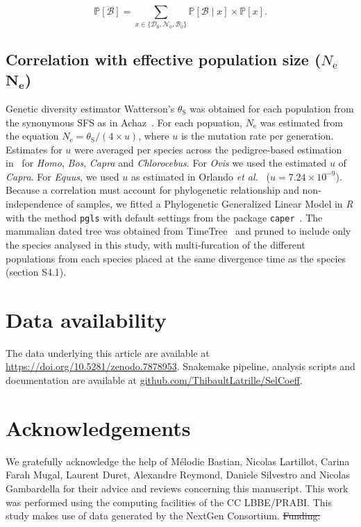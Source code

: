 \documentclass[10pt,letterpaper]{article}
\newcommand{\Ne}{N_{\text{e}}}
\newcommand{\proba}{\mathbb{P}}
\newcommand{\SphyDel}{\mathcal{D}_0}
\newcommand{\SphyNeu}{\mathcal{N}_0}
\newcommand{\SphyBen}{\mathcal{B}_0}
\newcommand{\Sphyclass}{x}
\newcommand{\given}{\mid}
\newcommand{\SpopBen}{\mathcal{B}}
\newcommand{\thetaSyn}{\theta_{\text{S}}}
\providecommand{\DIFdeltex}[1]{{\protect\color{red}\sout{#1}}}                      %
\providecommand{\DIFaddbegin}{} %
\providecommand{\DIFaddend}{} %
\providecommand{\DIFdelbegin}{} %
\providecommand{\DIFdelend}{} %
\providecommand{\DIFdel}[1]{\texorpdfstring{\DIFdeltex{#1}}{}} %
\newcommand{\DIFscaledelfig}{0.5}
\newlength{\DIFdelgraphicswidth} %
\newlength{\DIFdelgraphicsheight} %
\newcommand{\DIFaddincludegraphics}[2][]{{\color{blue}\fbox{\DIFOincludegraphics[#1]{#2}}}} %
\newcommand{\DIFdelincludegraphics}[2][]{%
\sbox{\DIFdelgraphicsbox}{\DIFOincludegraphics[#1]{#2}}%
\settoboxwidth{\DIFdelgraphicswidth}{\DIFdelgraphicsbox} %
\settoboxtotalheight{\DIFdelgraphicsheight}{\DIFdelgraphicsbox} %
\scalebox{\DIFscaledelfig}{%
\parbox[b]{\DIFdelgraphicswidth}{\usebox{\DIFdelgraphicsbox}\\[-\baselineskip] \rule{\DIFdelgraphicswidth}{0em}}\llap{\resizebox{\DIFdelgraphicswidth}{\DIFdelgraphicsheight}{%
\setlength{\unitlength}{\DIFdelgraphicswidth}%
\begin{picture}(1,1)%
\thicklines\linethickness{2pt} %
{\color[rgb]{1,0,0}\put(0,0){\framebox(1,1){}}}%
{\color[rgb]{1,0,0}\put(0,0){\line( 1,1){1}}}%
{\color[rgb]{1,0,0}\put(0,1){\line(1,-1){1}}}%
\end{picture}%
}\hspace*{3pt}}} %
} %
\DeclareRobustCommand{\DIFaddbegin}{\DIFOaddbegin \let\includegraphics\DIFaddincludegraphics} %
\DeclareRobustCommand{\DIFaddend}{\DIFOaddend \let\includegraphics\DIFOincludegraphics} %
\DeclareRobustCommand{\DIFdelbegin}{\DIFOdelbegin \let\includegraphics\DIFdelincludegraphics} %
\DeclareRobustCommand{\DIFdelend}{\DIFOaddend \let\includegraphics\DIFOincludegraphics} %
\begin{document}
\begin{equation}
\proba [ \SpopBen ] = \sum_{\Sphyclass \in \{\SphyDel, \SphyNeu, \SphyBen \} }\proba [\SpopBen \given \Sphyclass ] \times \proba [\Sphyclass ].
\label{eq:total_proba}
\end{equation}

\subsection{Correlation with effective population size (\DIFdelbegin \DIFdel{$\Ne$}\DIFdelend \DIFaddbegin \texorpdfstring{$\bm{\Ne}$}{Nₑ}\DIFaddend )}
\label{subsec:correlation-diversity}
Genetic diversity estimator Watterson's $\thetaSyn$ was obtained for each population from the synonymous SFS as in Achaz~\cite{achaz_frequency_2009}.
For each popuation, $\Ne$ was estimated from the equation $\Ne=\thetaSyn / (4 \times u)$, where $u$ is the mutation rate per generation.
Estimates for $u$ were averaged per species across the pedigree-based estimation in~\cite{bergeron_evolution_2023} for \textit{Homo}, \textit{Bos}, \textit{Capra} and \textit{Chlorocebus}.
For \textit{Ovis} we used the estimated $u$ of \textit{Capra}.
For \textit{Equus}, we used $u$ as estimated in Orlando \textit{et al.}~\cite{orlando_recalibrating_2013} ($u=7.24\times10^{-9}$).
Because a correlation must account for phylogenetic relationship and non-independence of samples, we fitted a Phylogenetic Generalized Linear Model in \textit{R} with the method \texttt{pgls} with default settings from the package \texttt{caper}~\cite{orme_caper_2013}.
The mammalian dated tree was obtained from TimeTree~\cite{kumar_timetree_2017} and pruned to include only the species analysed in this study, with multi-furcation of the different populations from each species placed at the same divergence time as the species (section S4.1).

\section*{Data availability}
The data underlying this article are available at \url{https://doi.org/10.5281/zenodo.7878953}.
Snakemake pipeline, analysis scripts and documentation are available at \href{https://github.com/ThibaultLatrille/SelCoeff}{github.com/ThibaultLatrille/SelCoeff}.

\section*{Acknowledgements}
\label{sec:acknowledgment}
We gratefully acknowledge the help of Mélodie Bastian, Nicolas Lartillot, Carina Farah Mugal, Laurent Duret, Alexandre Reymond, Daniele Silvestro and Nicolas Gambardella for their advice and reviews concerning this manuscript.
This work was performed using the computing facilities of the CC LBBE/PRABI\@.
This study makes use of data generated by the NextGen Consortium.
\DIFdelbegin \DIFdel{Funding:
}\DIFdelend \DIFaddbegin 
\end{document}
